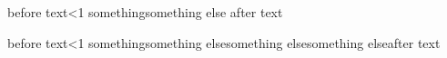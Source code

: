 before text\ifodd\x<1 something\or something else \fi after text

before text\ifodd\x<1 something\or something else\or something else\or something else\fi after text
